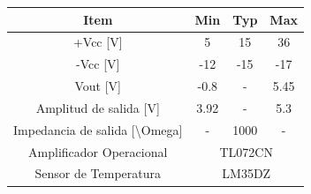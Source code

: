   \begin{table}[H]
    \begin{tabular}{c|ccc}
    \textbf{Item}                                    & \textbf{Min} & \textbf{Typ} & \textbf{Max} \\ \hline
    +Vcc {[}V{]}                                     & 5            & 15           & 36           \\
    -Vcc {[}V{]}                                     & -12          & -15          & -17          \\
    Vout {[}V{]}                                     & -0.8         & -            & 5.45         \\
    Amplitud de salida {[}V{]}                       & 3.92         & -            & 5.3          \\
    Impedancia de salida {[}\textbackslash{}Omega{]} & -            & 1000         & -            \\
    Amplificador Operacional                         & \multicolumn{3}{c|}{TL072CN}               \\
    Sensor de Temperatura                            & \multicolumn{3}{c|}{LM35DZ}               
    \end{tabular}
    \label{"Datasheet de la implementaci\'on"}
    \end{table}